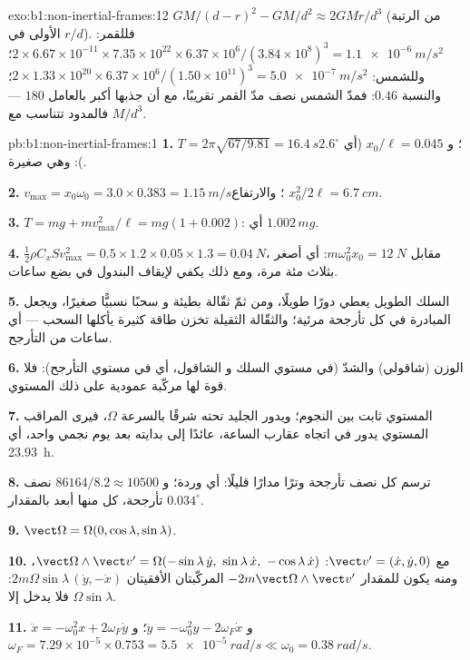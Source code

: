 \begin{solution}{exo:b1:non-inertial-frames:12}
$GM/(d - r)^2 - GM/d^2 \approx 2GMr/d^3$ (من الرتبة الأولى في $r/d$). فللقمر:
$2 \times 6.67\times10^{-11} \times 7.35\times10^{22} \times 6.37\times10^6/
(3.84\times10^8)^3 = \qty{1.1e-6}{m/s^2}$؛ وللشمس: $2 \times 1.33\times10^{20}
\times 6.37\times10^6/(1.50\times10^{11})^3 = \qty{5.0e-7}{m/s^2}$؛ والنسبة
$0.46$: فمدّ الشمس نصف مدّ القمر تقريبًا، مع أن
جذبها أكبر بالعامل $180$ --- فالمدود تتناسب مع $M/d^3$.
\end{solution}

\begin{solution}{pb:b1:non-inertial-frames:1}
\textbf{1.} $T = 2\pi\sqrt{67/9.81} = \qty{16.4}{s}$؛ و $x_0/\ell = 0.045$
(أي $2.6^\circ$): وهي صغيرة.

\textbf{2.} $v_{\max} = x_0\omega_0 = 3.0 \times 0.383 = \qty{1.15}{m/s}$؛ والارتفاع
$x_0^2/2\ell = \qty{6.7}{cm}$.

\textbf{3.} $T = mg + mv_{\max}^2/\ell = mg(1 + 0.002)$: أي $1.002\,mg$.

\textbf{4.} $\tfrac12\rho C_xSv_{\max}^2 = 0.5 \times 1.2 \times 0.05 \times 1.3 =
\qty{0.04}{N}$، مقابل $m\omega_0^2x_0 = \qty{12}{N}$: أي أصغر بثلاث مئة
مرة، ومع ذلك يكفي لإيقاف البندول في بضع ساعات.

\textbf{5.} السلك الطويل يعطي دورًا طويلًا، ومن ثمّ ثقّالة بطيئة و
سحبًا نسبيًّا صغيرًا، ويجعل المبادرة في كل تأرجحة مرئية؛ والثقّالة
الثقيلة تخزن طاقة كثيرة يأكلها السحب --- أي ساعات من التأرجح.

\textbf{6.} الوزن (شاقولي) والشدّ (في مستوي السلك و
الشاقول، أي في مستوي التأرجح): فلا قوة لها مركّبة
عمودية على ذلك المستوي.

\textbf{7.} المستوي ثابت بين النجوم؛ ويدور الجليد تحته
شرقًا بالسرعة $\Omega$، فيرى المراقب المستوي يدور في اتجاه عقارب الساعة،
عائدًا إلى بدايته بعد يوم نجمي واحد، أي \qty{23.93}{h}.

\textbf{8.} ترسم كل نصف تأرجحة وترًا مدارًا قليلًا: أي وردة؛
و $86164/8.2 \approx 10500$ نصف تأرجحة، كل منها أبعد بالمقدار $0.034^\circ$.

\textbf{9.} $\vect\Omega = \Omega(0, \cos\lambda, \sin\lambda)$.

\textbf{10.} مع $\vect v' = (\dot x, \dot y, 0)$:
$\vect\Omega\wedge\vect v' = \Omega(-\sin\lambda\,\dot y,\ \sin\lambda\,\dot x,\ -\cos\lambda\,\dot x)$،
ومنه يكون للمقدار $-2m\vect\Omega\wedge\vect v'$ المركّبتان الأفقيتان
$2m\Omega\sin\lambda\,(\dot y, -\dot x)$: فلا يدخل إلا $\Omega\sin\lambda$.

\textbf{11.} $\ddot x = -\omega_0^2x + 2\omega_F\dot y$ و $\ddot y = -\omega_0^2y -
2\omega_F\dot x$؛ و $\omega_F = 7.29\times10^{-5} \times 0.753 = \qty{5.5e-5}{rad/s}
\ll \omega_0 = \qty{0.38}{rad/s}$.


\end{solution}
